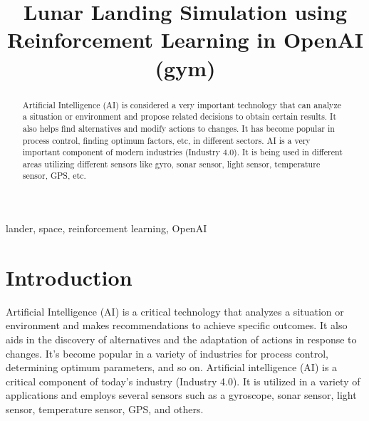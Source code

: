 \documentclass[conference]{IEEEtran}
\begin{document}
\title{Lunar Landing Simulation using Reinforcement Learning in OpenAI (gym)\\
}

\author{
\and
{}
\and
{}
}

\maketitle

\begin{abstract}
Artificial Intelligence (AI) is considered a very important technology that can analyze a situation or environment and propose related decisions to obtain certain results. It also helps find alternatives and modify actions to changes. It has become popular in process control, finding optimum factors, etc, in different sectors. AI is a very important component of modern industries (Industry 4.0). It is being used in different areas utilizing different sensors like gyro, sonar sensor, light sensor, temperature sensor, GPS, etc.
\end{abstract}

\begin{IEEEkeywords}
lander, space, reinforcement learning, OpenAI
\end{IEEEkeywords}

\section{Introduction}
Artificial Intelligence (AI) is a critical technology that analyzes a situation or environment and makes recommendations to achieve specific outcomes. It also aids in the discovery of alternatives and the adaptation of actions in response to changes. It's become popular in a variety of industries for process control, determining optimum parameters, and so on. Artificial intelligence (AI) is a critical component of today's industry (Industry 4.0). It is utilized in a variety of applications and employs several sensors such as a gyroscope, sonar sensor, light sensor, temperature sensor, GPS, and others.
\end{document}
